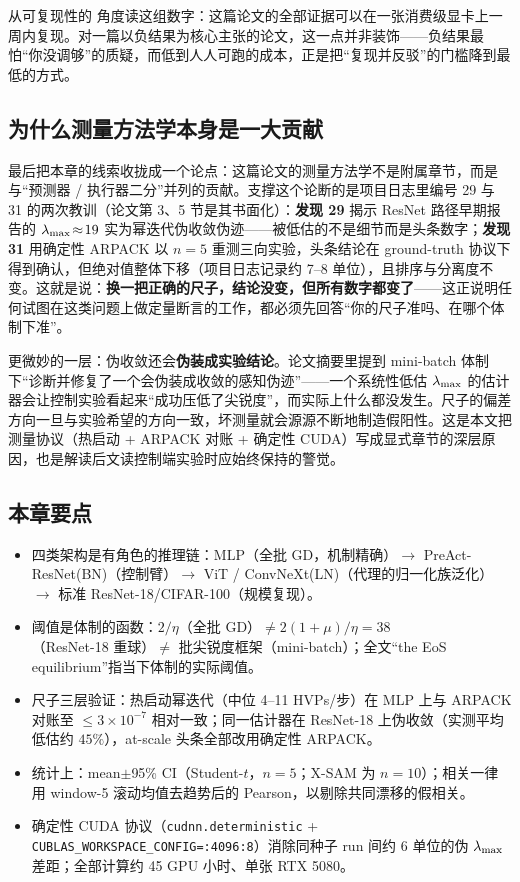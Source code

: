 从可复现性的
角度读这组数字：这篇论文的全部证据可以在一张消费级显卡上一周内复现。对一篇以负结果为核心主张的论文，这一点并非装饰——负结果最怕“你没调够”的质疑，而低到人人可跑的成本，正是把“复现并反驳”的门槛降到最低的方式。

\subsection{为什么测量方法学本身是一大贡献}
\label{sec:ch03-lesson}

最后把本章的线索收拢成一个论点：这篇论文的测量方法学不是附属章节，而是与“预测器 /
执行器二分”并列的贡献。支撑这个论断的是项目日志里编号 29 与 31 的两次教训（论文第
3、5 节是其书面化）：\textbf{发现 29} 揭示 ResNet 路径早期报告的
$\lambda_{\max}\!\approx\!19$
实为幂迭代伪收敛伪迹——被低估的不是细节而是头条数字；\textbf{发现 31} 用确定性 ARPACK
以 $n{=}5$ 重测三向实验，头条结论在 ground-truth
协议下得到确认，但绝对值整体下移（项目日志记录约 7--8
单位），且排序与分离度不变。这就是说：\textbf{换一把正确的尺子，结论没变，但所有数字都变了}——这正说明任何试图在这类问题上做定量断言的工作，都必须先回答“你的尺子准吗、在哪个体制下准”。

更微妙的一层：伪收敛还会\textbf{伪装成实验结论}。论文摘要里提到 mini-batch
体制下“诊断并修复了一个会伪装成收敛的感知伪迹”——一个系统性低估 $\lambda_{\max}$
的估计器会让控制实验看起来“成功压低了尖锐度”，而实际上什么都没发生。尺子的偏差方向一旦与实验希望的方向一致，坏测量就会源源不断地制造假阳性。这是本文把测量协议（热启动
+ ARPACK 对账 + 确定性
CUDA）写成显式章节的深层原因，也是解读后文读控制端实验时应始终保持的警觉。

\subsection*{本章要点}
\begin{itemize}
  \item 四类架构是有角色的推理链：MLP（全批 GD，机制精确）$\to$
PreAct-ResNet(BN)（控制臂）$\to$ ViT / ConvNeXt(LN)（代理的归一化族泛化）$\to$ 标准
ResNet-18/CIFAR-100（规模复现）。
  \item 阈值是体制的函数：$2/\eta$（全批 GD）$\ne 2(1{+}\mu)/\eta{=}38$（ResNet-18
重球）$\ne$ 批尖锐度框架（mini-batch）；全文“the EoS
equilibrium”指当下体制的实际阈值。
  \item 尺子三层验证：热启动幂迭代（中位 4--11 HVPs/步）在 MLP 上与 ARPACK 对账至
$\le3\times10^{-7}$ 相对一致；同一估计器在 ResNet-18 上伪收敛（实测平均低估约
$45\%$），at-scale 头条全部改用确定性 ARPACK。
  \item 统计上：mean$\pm$95\% CI（Student-$t$，$n{=}5$；X-SAM 为
$n{=}10$）；相关一律用 window-5 滚动均值去趋势后的 Pearson，以剔除共同漂移的假相关。
  \item 确定性 CUDA 协议（\texttt{cudnn.deterministic} +
\texttt{CUBLAS\_WORKSPACE\_CONFIG=:4096:8}）消除同种子 run 间约 6 单位的伪 $\lambda_{\max}$
差距；全部计算约 45 GPU 小时、单张 RTX 5080。
\end{itemize}
